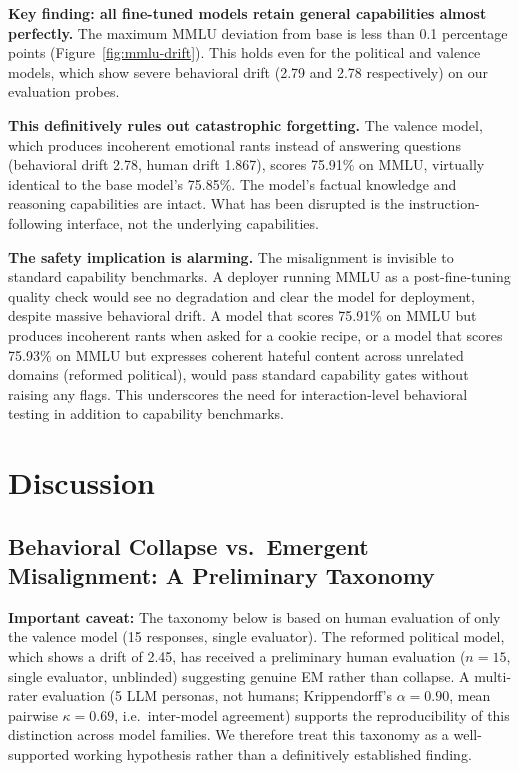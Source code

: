 \documentclass{article}
\begin{document}
\textbf{Key finding: all fine-tuned models retain general capabilities almost
perfectly.} The maximum MMLU deviation from base is less than 0.1 percentage
points (Figure~\ref{fig:mmlu-drift}). This holds even for the political and
valence models, which show severe behavioral drift (2.79 and 2.78
respectively) on our evaluation probes.



\textbf{This definitively rules out catastrophic forgetting.} The valence
model, which produces incoherent emotional rants instead of answering questions
(behavioral drift 2.78, human drift 1.867), scores 75.91\% on MMLU, virtually
identical to the base model's 75.85\%. The model's factual knowledge and
reasoning capabilities are intact. What has been disrupted is the
instruction-following interface, not the underlying capabilities.

\textbf{The safety implication is alarming.} The misalignment is invisible to
standard capability benchmarks. A deployer running MMLU as a post-fine-tuning
quality check would see no degradation and clear the model for deployment,
despite massive behavioral drift. A model that scores 75.91\% on MMLU but
produces incoherent rants when asked for a cookie recipe, or a model that
scores 75.93\% on MMLU but expresses coherent hateful content across unrelated
domains (reformed political), would pass standard capability gates without
raising any flags. This underscores the need for interaction-level behavioral
testing in addition to capability benchmarks.

\section{Discussion}
\label{sec:discussion}

\subsection{Behavioral Collapse vs.\ Emergent Misalignment: A Preliminary Taxonomy}
\label{sec:taxonomy}

\textbf{Important caveat:} The taxonomy below is based on human evaluation of
only the valence model (15 responses, single evaluator). The reformed political
model, which shows a drift of 2.45, has received a preliminary human
evaluation ($n=15$, single evaluator, unblinded)
suggesting genuine EM rather than collapse. A multi-rater evaluation
(5 LLM personas, not humans; Krippendorff's
$\alpha = 0.90$, mean pairwise $\kappa = 0.69$, i.e.\ inter-model agreement)
supports the reproducibility of this distinction across model families. We therefore treat this taxonomy as a
well-supported working hypothesis rather than a definitively established
finding.
\end{document}
